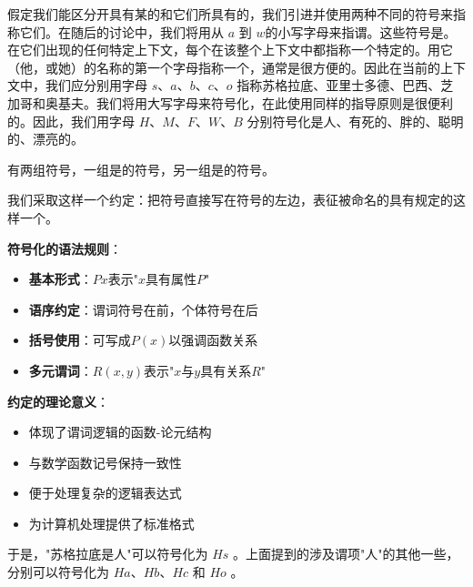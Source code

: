 \begin{theorembox}[title=符号化系统]
假定我们能区分开具有某的和它们所具有的，我们引进并使用两种不同的符号来指称它们。在随后的讨论中，我们将用从 $a$ 到 $w$的小写字母来指谓。这些符号是。在它们出现的任何特定上下文，每个在该整个上下文中都指称一个特定的。用它（他，或她）的名称的第一个字母指称一个，通常是很方便的。因此在当前的上下文中，我们应分别用字母 $s 、 a 、 b 、 c 、 o$ 指称苏格拉底、亚里士多德、巴西、芝加哥和奥基夫。我们将用大写字母来符号化，在此使用同样的指导原则是很便利的。因此，我们用字母 $H 、 M 、 F 、 W 、 B$ 分别符号化是人、有死的、胖的、聪明的、漂亮的。
\end{theorembox}

有两组符号，一组是的符号，另一组是的符号。

\begin{theorembox}[title=符号化约定的理论基础]
我们采取这样一个约定：把符号直接写在符号的左边，表征被命名的具有规定的这样一个。

\textbf{符号化的语法规则}：
\begin{itemize}
\item \textbf{基本形式}：$Px$表示"$x$具有属性$P$"
\item \textbf{语序约定}：谓词符号在前，个体符号在后
\item \textbf{括号使用}：可写成$P(x)$以强调函数关系
\item \textbf{多元谓词}：$R(x,y)$表示"$x$与$y$具有关系$R$"
\end{itemize}

\textbf{约定的理论意义}：
\begin{itemize}
\item 体现了谓词逻辑的函数-论元结构
\item 与数学函数记号保持一致性
\item 便于处理复杂的逻辑表达式
\item 为计算机处理提供了标准格式
\end{itemize}
\end{theorembox}

于是，"苏格拉底是人"可以符号化为 $H s$ 。上面提到的涉及谓项"人"的其他一些，分别可以符号化为 $H a 、 H b 、 H c$ 和 $H o$ 。

